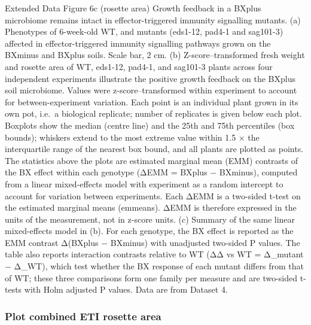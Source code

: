 \documentclass[
  10pt,
]{article}
\begin{document}
Extended Data Figure 6c (rosette area) \textbar{} Growth feedback in a
BXplus microbiome remains intact in effector-triggered immunity
signalling mutants. (a) Phenotypes of 6-week-old WT, and mutants
(eds1-12, pad4-1 and sag101-3) affected in effector-triggered immunity
signalling pathways grown on the BXminus and BXplus soils. Scale bar, 2
cm. (b) Z-score--transformed fresh weight and rosette area of WT,
eds1-12, pad4-1, and sag101-3 plants across four independent experiments
illustrate the positive growth feedback on the BXplus soil microbiome.
Values were z-score--transformed within experiment to account for
between-experiment variation. Each point is an individual plant grown in
its own pot, i.e.~a biological replicate; number of replicates is given
below each plot. Boxplots show the median (centre line) and the 25th and
75th percentiles (box bounds); whiskers extend to the most extreme value
within 1.5 × the interquartile range of the nearest box bound, and all
plants are plotted as points. The statistics above the plots are
estimated marginal mean (EMM) contrasts of the BX effect within each
genotype (ΔEMM = BXplus − BXminus), computed from a linear mixed-effects
model with experiment as a random intercept to account for variation
between experiments. Each ΔEMM is a two-sided t-test on the estimated
marginal means (emmeans). ΔEMM is therefore expressed in the units of
the measurement, not in z-score units. (c) Summary of the same linear
mixed-effects model in (b). For each genotype, the BX effect is reported
as the EMM contrast Δ(BXplus − BXminus) with unadjusted two-sided P
values. The table also reports interaction contrasts relative to WT (ΔΔ
vs WT = Δ\_mutant − Δ\_WT), which test whether the BX response of each
mutant differs from that of WT; these three comparisons form one family
per measure and are two-sided t-tests with Holm adjusted P values. Data
are from Dataset 4.

\subsubsection{Plot combined ETI rosette
area}\label{plot-combined-eti-rosette-area}
\end{document}

